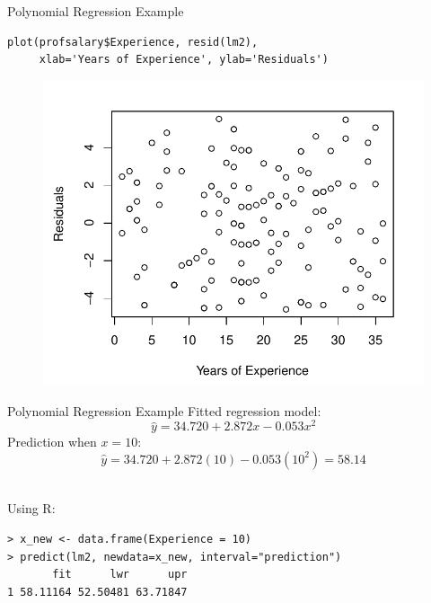 \documentclass[10pt]{beamer}
\begin{document}
\begin{frame}[fragile]{Polynomial Regression Example}
\small
\begin{verbatim}
plot(profsalary$Experience, resid(lm2), 
     xlab='Years of Experience', ylab='Residuals')
\end{verbatim}
\begin{figure}
\includegraphics[scale=0.5]{figure/salary_resid2.pdf}
\end{figure}
\end{frame}

\begin{frame}[fragile]{Polynomial Regression Example}
Fitted regression model:
$$\hat{y} = 34.720 + 2.872x - 0.053x^2 $$
Prediction when $x=10$:
$$\hat{y} = 34.720 + 2.872(10) - 0.053(10^2) = 58.14$$\\
\vspace{5pt}

Using R:
\begin{verbatim}
> x_new <- data.frame(Experience = 10)
> predict(lm2, newdata=x_new, interval="prediction")
       fit      lwr      upr
1 58.11164 52.50481 63.71847
\end{verbatim}
\end{frame}
\end{document}
